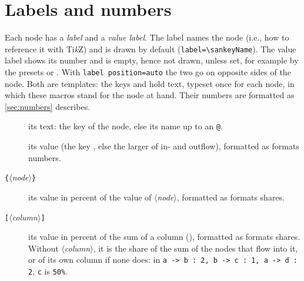 \documentclass[10pt,parskip=half,english,numbers=noenddot,footnotes=nomultiple,oneside]{scrartcl}
\let\T\texttt
\newcommand\meta[1]{\ensuremath{\langle}\textit{#1}\ensuremath{\rangle}}
\newcommand\marg[1]{\T{\{}\meta{#1}\T{\}}}
\newcommand\oarg[1]{\T{[}\meta{#1}\T{]}}
\begin{document}
\begin{example}
\end{example}
\begin{example}
\end{example}

\section{Labels and numbers}\label{sec:labels}
Each node has a \emph{label} and a \emph{value label}. The label names the node (i.e., how to reference it with Ti\emph{k}Z) and is drawn by default (\T{label=\textbackslash sankeyName}). The value label shows its number and is empty, hence not drawn, unless set, for example by the presets  or . With \T{label position=auto} the two go on opposite sides of the node. Both are templates: the keys  and  hold text, typeset once for each node, in which these macros stand for the node at hand. Their numbers are formatted as \cref{sec:numbers} describes.
\begin{description}
\item[] its text: the key  of the node, else its name up to an \T{@}.
\item[] its value (the key , else the larger of in- and outflow), formatted as  formats numbers.
\item[\marg{node}] its value in percent of the value of \meta{node}, formatted as  formats shares.
\item[\oarg{column}] its value in percent of the sum of a column (), formatted as  formats shares. Without \meta{column}, it is the share of the sum of the nodes that flow into it, or of its own column if none does: in \T{a -> b : 2, b -> c : 1, a -> d : 2}, \T{c} is \T{50\%}.
\end{description}
\end{document}
